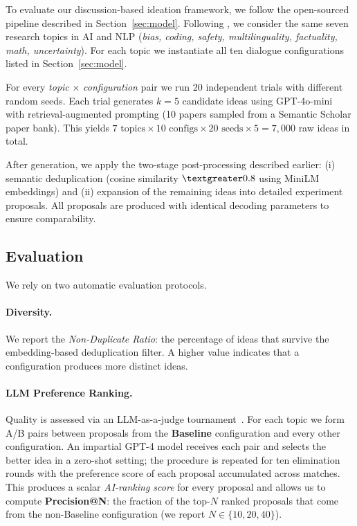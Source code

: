 \documentclass[11pt]{article}
\begin{document}
To evaluate our discussion-based ideation framework, we follow the open-sourced pipeline described in Section~\ref{sec:model}. Following \citet{si2025can}, we consider the same seven research topics in AI and NLP (\textit{bias, coding, safety, multilinguality, factuality, math, uncertainty}). For each topic we instantiate all ten dialogue configurations listed in Section~\ref{sec:model}. 

For every \textit{topic} $\times$ \textit{configuration} pair we run 20 independent trials with different random seeds. Each trial generates $k=5$ candidate ideas using GPT-4o-mini with retrieval-augmented prompting (10 papers sampled from a Semantic Scholar paper bank). This yields $7 \text{ topics} \times 10 \text{ configs} \times 20 \text{ seeds} \times 5 = 7{,}000$ raw ideas in total.

After generation, we apply the two-stage post-processing described earlier: (i) semantic deduplication (cosine similarity $\textgreater 0.8$ using MiniLM embeddings) and (ii) expansion of the remaining ideas into detailed experiment proposals. All proposals are produced with identical decoding parameters to ensure comparability.

\subsection{Evaluation}

We rely on two automatic evaluation protocols.

\paragraph{Diversity.} We report the \textit{Non-Duplicate Ratio}: the percentage of ideas that survive the embedding-based deduplication filter. A higher value indicates that a configuration produces more distinct ideas.

\paragraph{LLM Preference Ranking.} Quality is assessed via an LLM-as-a-judge tournament~\cite{si2025can}. For each topic we form A/B pairs between proposals from the \textbf{Baseline} configuration and every other configuration. An impartial GPT-4 model receives each pair and selects the better idea in a zero-shot setting; the procedure is repeated for ten elimination rounds with the preference score of each proposal accumulated across matches. This produces a scalar \textit{AI-ranking score} for every proposal and allows us to compute \textbf{Precision@N}: the fraction of the top-$N$ ranked proposals that come from the non-Baseline configuration (we report $N\!\in\!\{10,20,40\}$).
\end{document}
